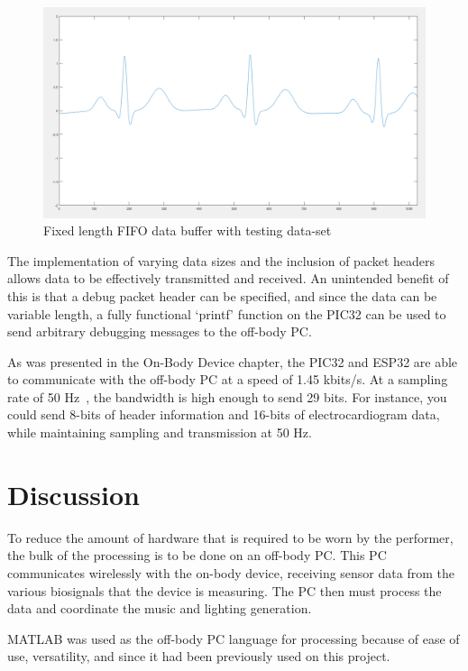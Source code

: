 \begin{figure}[!ht]
  \caption{Fixed length FIFO data buffer with testing data-set}\label{fig:matlab_packet_test2}
  \centering
  \includegraphics[width=1\columnwidth]{chapters/development/MATLAB/FULL_FILLED}
\end{figure}

The implementation of varying data sizes and the inclusion of packet headers allows data to be effectively transmitted and received.
An unintended benefit of this is that a debug packet header can be specified, and since the data can be variable length,
a fully functional `printf' function on the PIC32 can be used to send arbitrary debugging messages to the off-body PC.

As was presented in the On-Body Device chapter, the PIC32 and ESP32 are able to communicate with the off-body PC at a speed of 1.45 kbits/s.
At a sampling rate of 50 Hz~\cite{Ajdaraga:2017}, the bandwidth is high enough to send 29 bits.
For instance, you could send 8-bits of header information and 16-bits of electrocardiogram data, while maintaining sampling and transmission at 50 Hz.


\section{Discussion}
To reduce the amount of hardware that is required to be worn by the performer,
the bulk of the processing is to be done on an off-body PC.
This PC communicates wirelessly with the on-body device,
receiving sensor data from the various biosignals that the device is measuring.
The PC then must process the data and coordinate the music and lighting generation.

MATLAB was used as the off-body PC language for processing because of ease of use, versatility,
and since it had been previously used on this project.

